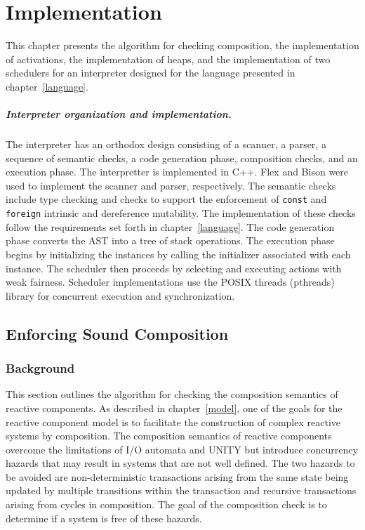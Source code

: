 \chapter{Implementation \label{implementation}}

This chapter presents the algorithm for checking composition, the implementation of activations, the implementation of heaps, and the implementation of two schedulers for an interpreter designed for the language presented in chapter~\ref{language}.

\paragraph{Interpreter organization and implementation.}
The interpreter has an orthodox design consisting of a scanner, a parser, a sequence of semantic checks, a code generation phase, composition checks, and an execution phase.
The interpretter is implemented in C++.
Flex and Bison were used to implement the scanner and parser, respectively.
The semantic checks include type checking and checks to support the enforcement of \verb+const+ and \verb+foreign+ intrinsic and dereference mutability.
The implementation of these checks follow the requirements set forth in chapter~\ref{language}.
The code generation phase converts the AST into a tree of stack operations.
The execution phase begins by initializing the instances by calling the initializer associated with each instance.
The scheduler then proceeds by selecting and executing actions with weak fairness.
Scheduler implementations use the POSIX threads (pthreads) library for concurrent execution and synchronization.

\section{Enforcing Sound Composition}

\subsection{Background}

This section outlines the algorithm for checking the composition semantics of reactive components.
As described in chapter~\ref{model}, one of the goals for the reactive component model is to facilitate the construction of complex reactive systems by composition.
The composition semantics of reactive components overcome the limitations of I/O automata and UNITY but introduce concurrency hazards that may result in systems that are not well defined.
The two hazards to be avoided are non-deterministic transactions arising from the same state being updated by multiple transitions within the transaction and recursive transactions arising from cycles in composition.
The goal of the composition check is to determine if a system is free of these hazards.

